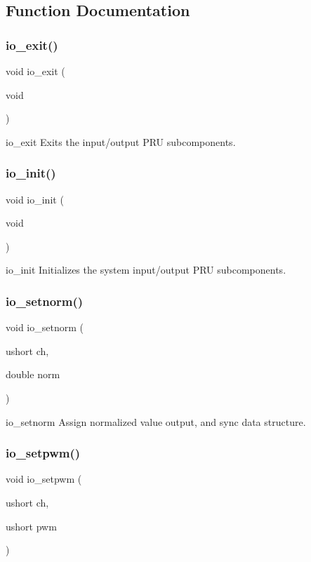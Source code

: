 \subsection{Function Documentation}
\mbox{\label{io_8h_ac0fe83d7ffc0214717ecc49383b3b714}} 
\subsubsection{io\+\_\+exit()}
{\footnotesize\ttfamily void io\+\_\+exit (\begin{DoxyParamCaption}\item[{void}]{ }\end{DoxyParamCaption})}

io\+\_\+exit Exits the input/output P\+RU subcomponents. \mbox{\label{io_8h_a43bba613ce0efd6af387cd04458ede8d}} 
\subsubsection{io\+\_\+init()}
{\footnotesize\ttfamily void io\+\_\+init (\begin{DoxyParamCaption}\item[{void}]{ }\end{DoxyParamCaption})}

io\+\_\+init Initializes the system input/output P\+RU subcomponents. \mbox{\label{io_8h_aeaceb85e7c7a6699293c41cd705d85ec}} 
\subsubsection{io\+\_\+setnorm()}
{\footnotesize\ttfamily void io\+\_\+setnorm (\begin{DoxyParamCaption}\item[{ushort}]{ch,  }\item[{double}]{norm }\end{DoxyParamCaption})}

io\+\_\+setnorm Assign normalized value output, and sync data structure. \mbox{\label{io_8h_a191ff0f457d740faf9e13fb75b6efc9e}} 
\subsubsection{io\+\_\+setpwm()}
{\footnotesize\ttfamily void io\+\_\+setpwm (\begin{DoxyParamCaption}\item[{ushort}]{ch,  }\item[{ushort}]{pwm }\end{DoxyParamCaption})}

